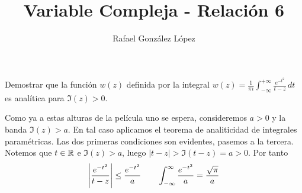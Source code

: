 \documentclass[twoside]{article}
\begin{document}
\title{Variable Compleja - Relación 6}
\author{Rafael González López}
\maketitle


\begin{ejercicio}{1}
Demostrar que la función $w(z)$ definida por la integral
$\displaystyle{w(z)=\frac{1}{\pi i}\int_{-\infty}^{+\infty}\frac{e^{-t^2}}{t-z}\,dt}$
es analítica para $\Im(z)>0$. 
\end{ejercicio}
\begin{solucion}
Como ya a estas alturas de la película uno se espera, consideremos $a>0$ y la banda $\Im(z)>a$. En tal caso aplicamos el teorema de analiticidad de integrales paramétricas. Las dos primeras condiciones son evidentes, pasemos a la tercera. Notemos que $t \in \mathbb{R}$ e $\Im(z)>a$, luego $|t-z| > \Im(t-z) = a>0$. Por tanto
$$
\left\lvert\frac{e^{-t^2}}{t-z}\right\rvert\leq \frac{e^{-t^2}}{a} \qquad \int_{-\infty}^\infty \frac{e^{-t^2}}{a} = \frac{\sqrt{\pi}}{a}
$$ 
\end{solucion}
\end{document}
